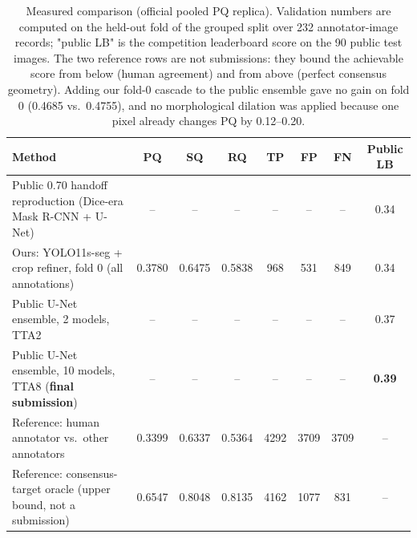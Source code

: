 \documentclass[sigconf]{acmart}
\begin{document}
\begin{table}[tbp]
\caption{Measured comparison (official pooled PQ replica). Validation numbers are computed on the held-out fold of the grouped split over 232 annotator-image records; "public LB" is the competition leaderboard score on the 90 public test images. The two reference rows are not submissions: they bound the achievable score from below (human agreement) and from above (perfect consensus geometry). Adding our fold-0 cascade to the public ensemble gave no gain on fold 0 (0.4685 vs.\ 0.4755), and no morphological dilation was applied because one pixel already changes PQ by 0.12--0.20.}
\label{tab:results}
\centering
\footnotesize
\setlength{\tabcolsep}{3.5pt}
\begin{tabular}{@{}lccccccc@{}}
\toprule
Method & PQ & SQ & RQ & TP & FP & FN & Public LB \\
\midrule
Public 0.70 handoff reproduction (Dice-era Mask R-CNN + U-Net) & -- & -- & -- & -- & -- & -- & 0.34 \\
Ours: YOLO11s-seg + crop refiner, fold 0 (all annotations) & 0.3780 & 0.6475 & 0.5838 & 968 & 531 & 849 & 0.34 \\
Public U-Net ensemble, 2 models, TTA2 & -- & -- & -- & -- & -- & -- & 0.37 \\
Public U-Net ensemble, 10 models, TTA8 (\textbf{final submission}) & -- & -- & -- & -- & -- & -- & \textbf{0.39} \\
\midrule
Reference: human annotator vs.\ other annotators~\cite{magfilo2024} & 0.3399 & 0.6337 & 0.5364 & 4292 & 3709 & 3709 & -- \\
Reference: consensus-target oracle (upper bound, not a submission) & 0.6547 & 0.8048 & 0.8135 & 4162 & 1077 & 831 & -- \\
\bottomrule
\end{tabular}
\end{table}
\end{document}

